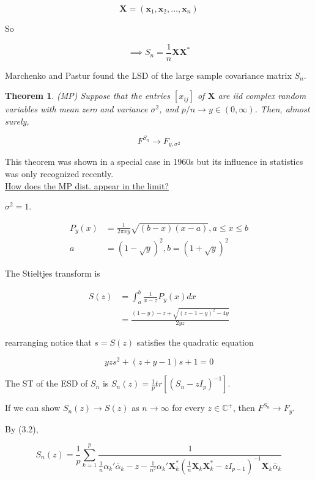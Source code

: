 \documentclass[twoside]{article}
\newcounter{lecnum}
\newcommand*\mean[1]{\bar{#1}}
\newtheorem{theorem}{Theorem}[lecnum]
\begin{document}
$$\mathbf{X}=(\mathbf{x}_1,\mathbf{x}_2,\dots,\mathbf{x}_n)$$

So

$$\implies S_n=\frac{1}{n}\mathbf{X}\mathbf{X}^*$$

Marchenko and Pastur found the LSD of the large sample covariance matrix $S_n$.\\

\begin{theorem}
	(MP) Suppose that the entries $[x_{ij}]$ of $\mathbf{X}$ are iid complex random variables with mean zero and variance $\sigma^2$, and $p/n\to y\in(0,\infty)$. Then, almost surely,
	
	$$F^{S_n}\to F_{y,\sigma^2}$$
\end{theorem}

This theorem was shown in a special case in 1960s but its influence in statistics was only recognized recently.\\

\underline{How does the MP dist. appear in the limit?}

$\sigma^2=1$.

\begin{equation}
	\begin{split}
		P_y(x)&=\frac{1}{2\pi xy}\sqrt{(b-x)(x-a)}, a\leq x\leq b\\
		a&=(1-\sqrt{{y}})^2, b=(1+\sqrt{y})^2
	\end{split}
\end{equation}

The Stieltjes transform is

\begin{equation}
	\begin{split}
		S(z)&=\int^b_a\frac{1}{x-z}P_y(x)dx\\
		&=\frac{(1-y)-z+\sqrt{(z-1-y)^2-4y}}{2yz}
	\end{split}
\end{equation}

rearranging notice that $s=S(z)$ satisfies the quadratic equation

$$yzs^2+(z+y-1)s+1=0$$

The ST of the ESD of $S_n$ is $S_n(z)=\frac{1}{p}tr[(S_n-zI_p)^{-1}]$.

If we can show $S_n(z)\to S(z)$ as $n\to \infty$ for every $z\in\mathbb{C}^+$, then $F^{S_n}\to F_y$.

By (3.2),

$$S_n(z)=\frac{1}{p}\sum^p_{k=1}\frac{1}{\frac{1}{n}\alpha_k'\mean{\alpha}_k-z-\frac{1}{n^2}\alpha_k'\mathbf{X}_k^*\left(\frac1n\mathbf{X}_k\mathbf{X}_k^*-zI_{p-1}\right)^{-1}\mathbf{X}_k\mean{\alpha}_k}$$
\end{document}
